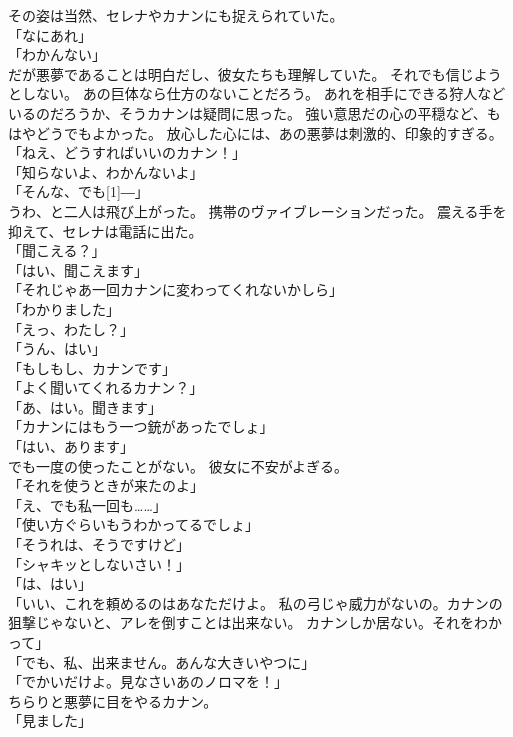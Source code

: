 \documentclass[../IHMain]{subfiles}
\begin{document}
その姿は当然、セレナやカナンにも捉えられていた。\\
「なにあれ」\\
「わかんない」\\
だが悪夢であることは明白だし、彼女たちも理解していた。
それでも信じようとしない。
あの巨体なら仕方のないことだろう。
あれを相手にできる狩人などいるのだろうか、そうカナンは疑問に思った。
強い意思だの心の平穏など、もはやどうでもよかった。
放心した心には、あの悪夢は刺激的、印象的すぎる。\\
「ねえ、どうすればいいのカナン！」\\
「知らないよ、わかんないよ」\\
「そんな、でも\scalebox{3}[1]{―}」\\
うわ、と二人は飛び上がった。
携帯のヴァイブレーションだった。
震える手を抑えて、セレナは電話に出た。\\
「聞こえる？」\\
「はい、聞こえます」\\
「それじゃあ一回カナンに変わってくれないかしら」\\
「わかりました」\\
「えっ、わたし？」\\
「うん、はい」\\
「もしもし、カナンです」\\
「よく聞いてくれるカナン？」\\
「あ、はい。聞きます」\\
「カナンにはもう一つ銃があったでしょ」\\
「はい、あります」\\
でも一度の使ったことがない。
彼女に不安がよぎる。\\
「それを使うときが来たのよ」\\
「え、でも私一回も……」\\
「使い方ぐらいもうわかってるでしょ」\\
「そうれは、そうですけど」\\
「シャキッとしないさい！」\\
「は、はい」\\
「いい、これを頼めるのはあなただけよ。
私の弓じゃ威力がないの。カナンの狙撃じゃないと、アレを倒すことは出来ない。
カナンしか居ない。それをわかって」\\
「でも、私、出来ません。あんな大きいやつに」\\
「でかいだけよ。見なさいあのノロマを！」\\
ちらりと悪夢に目をやるカナン。\\
「見ました」\\
\end{document}

